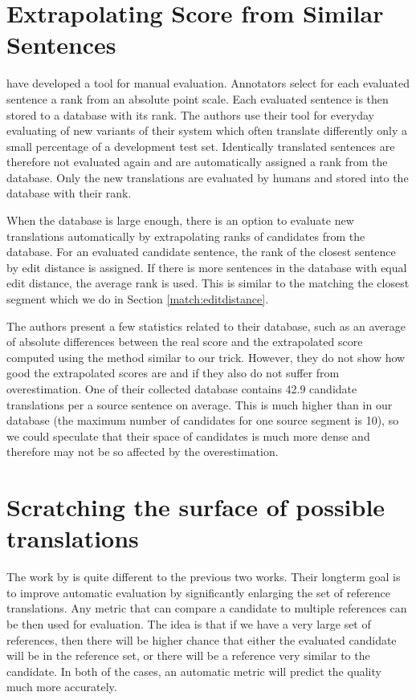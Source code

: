\section{Extrapolating Score from Similar Sentences}

 have developed a tool for manual evaluation.
Annotators select for each evaluated sentence a rank from an absolute point
scale. Each evaluated sentence is then stored to a database with its rank. The
authors use their tool for everyday evaluating of new variants of their system
which often translate differently only a small percentage of a development test
set. Identically translated sentences are therefore not evaluated again and are
automatically assigned a rank from the database. Only the new translations are
evaluated by humans and stored into the database with their rank.

When the database is large enough, there is an option to evaluate new
translations automatically by extrapolating ranks of candidates from the
database.  For an evaluated candidate sentence, the rank of the closest
sentence by edit distance is assigned. If there is more sentences in the
database with equal edit distance, the average rank is used. This is similar to
the matching the closest segment which we do in Section
\ref{match:editdistance}.

The authors present a few statistics related to their database, such as an
average of absolute differences between the real score and the extrapolated
score computed using the method similar to our  trick.
However, they do not show how good the extrapolated scores are and if they also
do not suffer from overestimation. One of their collected database contains
42.9 candidate translations per a source sentence on average. This is much
higher than in our database (the maximum number of candidates for one source
segment is 10), so we could speculate that their space of candidates is much
more dense and therefore may not be so affected by the overestimation.

\section{Scratching the surface of possible translations}

The work by  is quite different to the previous
two works. Their longterm goal is to improve automatic evaluation by
significantly enlarging the set of reference translations. Any metric that can
compare a candidate to multiple references can be then used for evaluation. The
idea is that if we have a very large set of references, then there will be higher
chance that either the evaluated candidate will be in the reference set, or
there will be a reference very similar to the candidate. In both of the cases,
an automatic metric will predict the quality much more accurately. 

